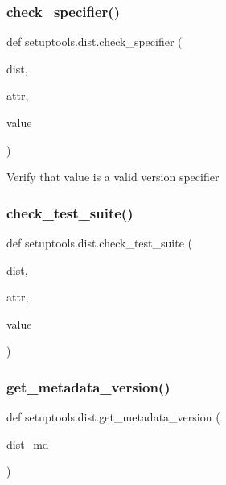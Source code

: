 \subsubsection{\texorpdfstring{check\+\_\+specifier()}{check\_specifier()}}
{\footnotesize\ttfamily def setuptools.\+dist.\+check\+\_\+specifier (\begin{DoxyParamCaption}\item[{}]{dist,  }\item[{}]{attr,  }\item[{}]{value }\end{DoxyParamCaption})}

\begin{DoxyVerb}Verify that value is a valid version specifier\end{DoxyVerb}
 \mbox{\label{namespacesetuptools_1_1dist_a6a197d513c80b32120484d6c7dd29066}} 
\subsubsection{\texorpdfstring{check\+\_\+test\+\_\+suite()}{check\_test\_suite()}}
{\footnotesize\ttfamily def setuptools.\+dist.\+check\+\_\+test\+\_\+suite (\begin{DoxyParamCaption}\item[{}]{dist,  }\item[{}]{attr,  }\item[{}]{value }\end{DoxyParamCaption})}

\mbox{\label{namespacesetuptools_1_1dist_a6b2c2fcf3e6b5aa5c8434b64c92f23b6}} 
\subsubsection{\texorpdfstring{get\+\_\+metadata\+\_\+version()}{get\_metadata\_version()}}
{\footnotesize\ttfamily def setuptools.\+dist.\+get\+\_\+metadata\+\_\+version (\begin{DoxyParamCaption}\item[{}]{dist\+\_\+md }\end{DoxyParamCaption})}

